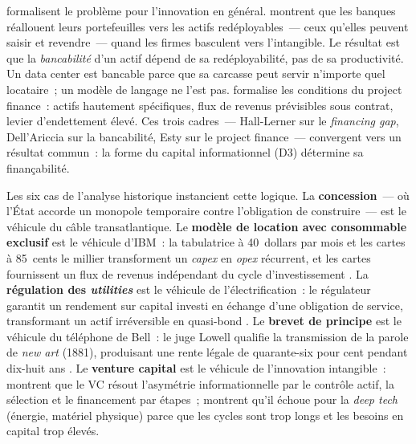 \markINFO \textcite{hall_financing_2010} formalisent le problème pour l'innovation en général.  \textcite{dell_ariccia_bank_2021} montrent que les banques réallouent leurs portefeuilles vers les actifs redéployables~--- ceux qu'elles peuvent saisir et revendre~--- quand les firmes basculent vers l'intangible. Le résultat est que la \emph{bancabilité} d'un actif dépend de sa redéployabilité, pas de sa productivité. Un data center est bancable parce que sa carcasse peut servir n'importe quel locataire~; un modèle de langage ne l'est pas. \textcite{esty_why_2004} formalise les conditions du project finance~: actifs hautement spécifiques, flux de revenus prévisibles sous contrat, levier d'endettement élevé. Ces trois cadres~--- Hall-Lerner sur le \emph{financing gap}, Dell'Ariccia sur la bancabilité, Esty sur le project finance~--- convergent vers un résultat commun~: la forme du capital informationnel (D3) détermine sa finançabilité.

Les six cas de l'analyse historique instancient cette logique. La \textbf{concession}~--- où l'État accorde un monopole temporaire contre l'obligation de construire~--- est le véhicule du câble transatlantique. Le \textbf{modèle de location avec consommable exclusif} est le véhicule d'IBM~: la tabulatrice à 40~dollars par mois et les cartes à 85~cents le millier transforment un \emph{capex} en \emph{opex} récurrent, et les cartes fournissent un flux de revenus indépendant du cycle d'investissement \parencite{cortada_before_1993}. La \textbf{régulation des \emph{utilities}} est le véhicule de l'électrification~: le régulateur garantit un rendement sur capital investi en échange d'une obligation de service, transformant un actif irréversible en quasi-bond \parencite{hughes_networks_1983}. Le \textbf{brevet de principe} est le véhicule du téléphone de Bell~: le juge Lowell qualifie la transmission de la parole de \og \emph{new art}\fg{} (1881), produisant une rente légale de quarante-six pour cent pendant dix-huit ans \parencite{gabel_early_1969}. Le \textbf{venture capital} est le véhicule de l'innovation intangible~: \textcite{hall_financing_2010} montrent que le VC résout l'asymétrie informationnelle par le contrôle actif, la sélection et le financement par étapes~; \textcite{lerner_venture_2020} montrent qu'il échoue pour la \emph{deep tech} (énergie, matériel physique) parce que les cycles sont trop longs et les besoins en capital trop élevés.

